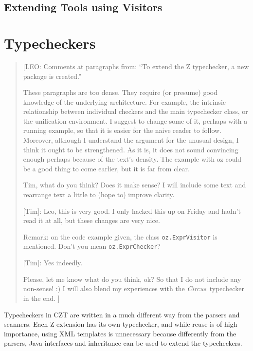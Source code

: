 \documentclass{llncs}
\newcommand{\Circus}{{\sf\slshape Circus}}
\begin{document}
\subsection{Extending Tools using Visitors}
\label{extending-visitors}


\section{Typecheckers}
\label{typecheckers}

\begin{quotation}
[LEO: Comments at paragraphs from: ``To extend the Z typechecker,
      a new package is created.''

      \vspace{5pt}

      These paragraphs are too dense. They require (or presume) good knowledge of
      the underlying architecture. For example, the intrinsic relationship between
      individual checkers and the main typechecker class, or the unification environment.
      I suggest to change some of it, perhaps with a running example, so that it is easier
      for the naive reader to follow.
      Moreover, although I understand the argument for the unusual design,
      I think it ought to be strengthened. As it is, it does not sound convincing
      enough perhaps because of the text's density. The example with oz could be
      a good thing to come earlier, but it is far from clear.

      \vspace{5pt}

      Tim, what do you think? Does it make sense?
      I will include some text and rearrange text a little to (hope
      to) improve clarity.

      [Tim]: Leo, this is very good. I only hacked this up on Friday
      and hadn't read it at all, but these changes are very nice.

      Remark: on the code example given, the class {\tt oz.ExprVisitor} is mentioned.
      Don't you mean {\tt oz.ExprChecker}?

     [Tim]: Yes indeedly.

      Please, let me know what do you think, ok? So that I do not include any non-sense! :)
      I will also blend my experiences with the \Circus\ typechecker in the end.
      ]
\end{quotation}

Typecheckers in CZT are written in a much different way from the parsers
and scanners. Each Z extension has its own typechecker, and while reuse
is of high importance, using XML templates is unnecessary because
differently from the parsers, Java interfaces and inheritance can be used to
extend the typecheckers.
\end{document}
